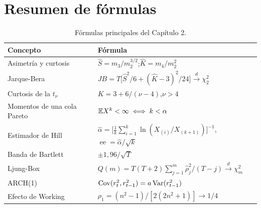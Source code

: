 \section{Resumen de fórmulas}

\begin{table}[H]
\centering\small
\begin{tabular}{@{}ll@{}}
\toprule
Concepto & Fórmula \\
\midrule
Asimetría y curtosis & $\hat S=m_3/m_2^{3/2}$;\quad $\hat K=m_4/m_2^{2}$ \\
Jarque-Bera & $JB=T\bigl[\hat S^2/6+(\hat K-3)^2/24\bigr]\xrightarrow{d}\chi^2_2$ \\
Curtosis de la $t_\nu$ & $K=3+6/(\nu-4)$,\quad $\nu>4$ \\
Momentos de una cola Pareto & $\mathbb{E} X^k<\infty\iff k<\alpha$ \\
Estimador de Hill & $\hat\alpha=\bigl[\frac1k\sum_{i=1}^k\ln(X_{(i)}/X_{(k+1)})\bigr]^{-1}$,\quad $\operatorname{ee}=\hat\alpha/\sqrt k$ \\
Banda de Bartlett & $\pm1{,}96/\sqrt T$ \\
Ljung-Box & $Q(m)=T(T+2)\sum_{j=1}^m\hat\rho_j^2/(T-j)\xrightarrow{d}\chi^2_m$ \\
ARCH(1) & $\operatorname{Cov}(r_t^2,r_{t-1}^2)=a\operatorname{Var}(r_{t-1}^2)$ \\
Efecto de Working & $\rho_1=(n^2-1)/[2(2n^2+1)]\to1/4$ \\
\bottomrule
\end{tabular}
\caption{Fórmulas principales del Capítulo 2.}
\end{table}

